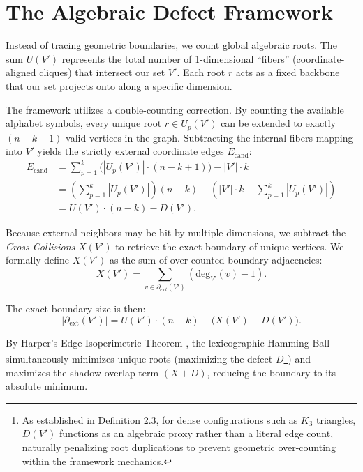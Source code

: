 \documentclass[11pt, letterpaper]{article}
\theoremstyle{definition}
\theoremstyle{remark}
\begin{document}
\section{The Algebraic Defect Framework}

Instead of tracing geometric boundaries, we count global algebraic roots. The sum $U(V')$ represents the total number of 1-dimensional ``fibers'' (coordinate-aligned cliques) that intersect our set $V'$. Each root $r$ acts as a fixed backbone that our set projects onto along a specific dimension.

The framework utilizes a double-counting correction. By counting the available alphabet symbols, every unique root $r \in U_p(V')$ can be extended to exactly $(n - k + 1)$ valid vertices in the graph. Subtracting the internal fibers mapping into $V'$ yields the strictly external coordinate edges $E_{\mathrm{cand}}$:
\begin{align*}
  E_{\mathrm{cand}} &= \sum_{p=1}^k \Big( |U_p(V')| \cdot (n - k + 1) \Big) - |V'| \cdot k \\
           &= \left(\sum_{p=1}^k |U_p(V')|\right)(n-k) - \left(|V'| \cdot k - \sum_{p=1}^k |U_p(V')|\right) \\
           &= U(V') \cdot (n-k) - D(V').
\end{align*}

Because external neighbors may be hit by multiple dimensions, we subtract the \emph{Cross-Collisions} $X(V')$ to retrieve the exact boundary of unique vertices. We formally define $X(V')$ as the sum of over-counted boundary adjacencies:
\begin{equation*}
X(V') = \sum_{v \in \partial_{ext}(V')} (\text{deg}_{V'}(v) - 1).
\end{equation*}

The exact boundary size is then:
\begin{equation*}
\left| \partial_{\mathrm{ext}}(V') \right| = U(V') \cdot (n - k) - \big(X(V') + D(V')\big).
\end{equation*}

By Harper's Edge-Isoperimetric Theorem \cite{harper1966optimal}, the lexicographic Hamming Ball simultaneously minimizes unique roots (maximizing the defect $D$\footnote{As established in Definition 2.3, for dense configurations such as $K_3$ triangles, $D(V')$ functions as an algebraic proxy rather than a literal edge count, naturally penalizing root duplications to prevent geometric over-counting within the framework mechanics.}) and maximizes the shadow overlap term $(X+D)$, reducing the boundary to its absolute minimum.
\end{document}
